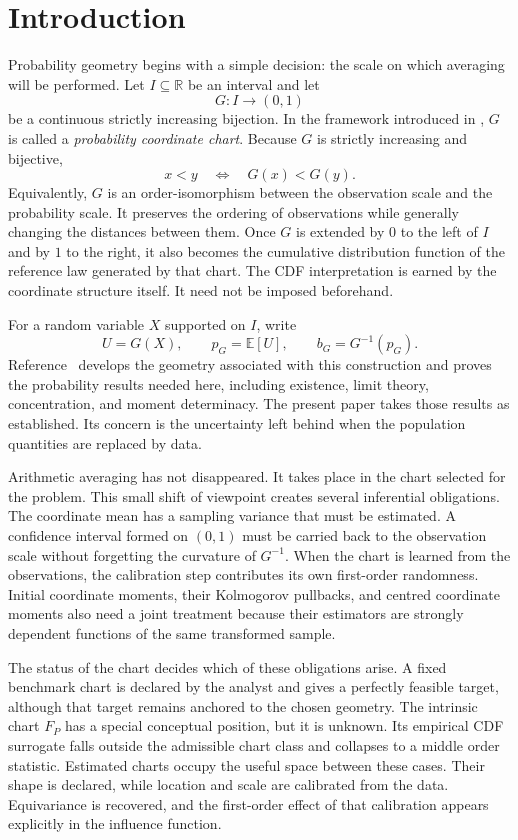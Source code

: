 \documentclass[11pt,a4paper]{article}
\theoremstyle{definition}
\newcommand{\E}{\mathbb{E}}
\newcommand{\R}{\mathbb{R}}
\begin{document}
\section{Introduction}

Probability geometry begins with a simple decision: the scale on which averaging will be performed. Let $I\subseteq\R$ be an interval and let
\[
G:I\longrightarrow(0,1)
\]
be a continuous strictly increasing bijection. In the framework introduced in \cite{Cojocea2026}, $G$ is called a \emph{probability coordinate chart}. Because $G$ is strictly increasing and bijective,
\[
x<y \quad\Longleftrightarrow\quad G(x)<G(y).
\]
Equivalently, $G$ is an order-isomorphism between the observation scale and the probability scale. It preserves the ordering of observations while generally changing the distances between them. Once $G$ is extended by $0$ to the left of $I$ and by $1$ to the right, it also becomes the cumulative distribution function of the reference law generated by that chart. The CDF interpretation is earned by the coordinate structure itself. It need not be imposed beforehand.

For a random variable $X$ supported on $I$, write
\[
U=G(X),\qquad p_G=\E[U],\qquad b_G=G^{-1}(p_G).
\]
Reference~\cite{Cojocea2026} develops the geometry associated with this construction and proves the probability results needed here, including existence, limit theory, concentration, and moment determinacy. The present paper takes those results as established. Its concern is the uncertainty left behind when the population quantities are replaced by data.

Arithmetic averaging has not disappeared. It takes place in the chart selected for the problem. This small shift of viewpoint creates several inferential obligations. The coordinate mean has a sampling variance that must be estimated. A confidence interval formed on $(0,1)$ must be carried back to the observation scale without forgetting the curvature of $G^{-1}$. When the chart is learned from the observations, the calibration step contributes its own first-order randomness. Initial coordinate moments, their Kolmogorov pullbacks, and centred coordinate moments also need a joint treatment because their estimators are strongly dependent functions of the same transformed sample.

The status of the chart decides which of these obligations arise. A fixed benchmark chart is declared by the analyst and gives a perfectly feasible target, although that target remains anchored to the chosen geometry. The intrinsic chart $F_P$ has a special conceptual position, but it is unknown. Its empirical CDF surrogate falls outside the admissible chart class and collapses to a middle order statistic. Estimated charts occupy the useful space between these cases. Their shape is declared, while location and scale are calibrated from the data. Equivariance is recovered, and the first-order effect of that calibration appears explicitly in the influence function.
\end{document}
